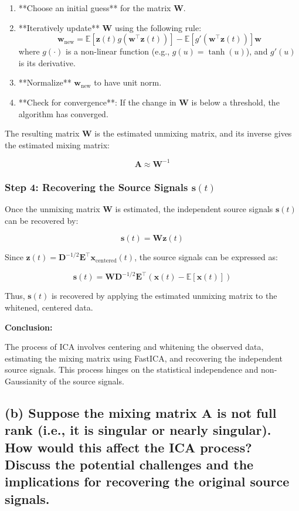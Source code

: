 \documentclass{exam}
\begin{document}
\begin{enumerate}
    \item **Choose an initial guess** for the matrix \( \mathbf{W} \).
    \item **Iteratively update** \( \mathbf{W} \) using the following rule:
    \[
    \mathbf{w}_{\text{new}} = \mathbb{E}[\mathbf{z}(t) g(\mathbf{w}^\top \mathbf{z}(t))] - \mathbb{E}[g'(\mathbf{w}^\top \mathbf{z}(t))] \mathbf{w}
    \]
    where \( g(\cdot) \) is a non-linear function (e.g., \( g(u) = \tanh(u) \)), and \( g'(u) \) is its derivative.
    \item **Normalize** \( \mathbf{w}_{\text{new}} \) to have unit norm.
    \item **Check for convergence**: If the change in \( \mathbf{W} \) is below a threshold, the algorithm has converged.
\end{enumerate}

The resulting matrix \( \mathbf{W} \) is the estimated unmixing matrix, and its inverse gives the estimated mixing matrix:

\[
\mathbf{A} \approx \mathbf{W}^{-1}
\]

\subsubsection{Step 4: Recovering the Source Signals \(\mathbf{s}(t)\)}

Once the unmixing matrix \( \mathbf{W} \) is estimated, the independent source signals \( \mathbf{s}(t) \) can be recovered by:

\[
\mathbf{s}(t) = \mathbf{W} \mathbf{z}(t)
\]

Since \( \mathbf{z}(t) = \mathbf{D}^{-1/2} \mathbf{E}^\top \mathbf{x}_{\text{centered}}(t) \), the source signals can be expressed as:

\[
\mathbf{s}(t) = \mathbf{W} \mathbf{D}^{-1/2} \mathbf{E}^\top \left(\mathbf{x}(t) - \mathbb{E}[\mathbf{x}(t)]\right)
\]

Thus, \( \mathbf{s}(t) \) is recovered by applying the estimated unmixing matrix to the whitened, centered data.

\textbf{Conclusion:}

The process of ICA involves centering and whitening the observed data, estimating the mixing matrix using FastICA, and recovering the independent source signals. This process hinges on the statistical independence and non-Gaussianity of the source signals.

\subsection{(b) Suppose the mixing matrix \(\mathbf{A}\) is not full rank (i.e., it is singular or nearly singular). How would this affect the ICA process? Discuss the potential challenges and the implications for recovering the original source signals.}
\end{document}
